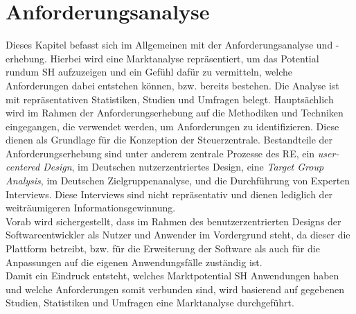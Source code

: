 \chapter{Anforderungsanalyse}
\label{chap:anforderungsanalyse}
    Dieses Kapitel befasst sich im Allgemeinen mit der Anforderungsanalyse und -erhebung. Hierbei wird eine
    Marktanalyse repräsentiert, um das Potential rundum \acl{SH} aufzuzeigen und ein Gefühl 
    dafür zu vermitteln, welche Anforderungen dabei entstehen können, bzw. bereits bestehen. Die Analyse ist 
    mit repräsentativen Statistiken, Studien und Umfragen belegt. Hauptsächlich wird im Rahmen der Anforderungserhebung 
    auf die Methodiken und Techniken eingegangen, die verwendet werden, um 
    Anforderungen zu identifizieren. Diese dienen als Grundlage für die Konzeption der Steuerzentrale. Bestandteile der 
    Anforderungserhebung sind unter anderem zentrale Prozesse des \acl{RE}, ein \textit{user-centered Design}, im Deutschen 
    nutzerzentriertes Design, eine \textit{Target Group Analysis}, im Deutschen Zielgruppenanalyse, und die Durchführung von 
    Experten Interviews. Diese Interviews sind nicht repräsentativ und dienen lediglich der weiträumigeren Informationsgewinnung. 
    \\
    Vorab wird sichergestellt, dass im Rahmen des benutzerzentrierten Designs der Softwareentwickler als Nutzer und Anwender im 
    Vordergrund steht, da dieser die Plattform betreibt, bzw. für die Erweiterung der Software als auch für die 
    Anpassungen auf die eigenen Anwendungsfälle zuständig ist.
    \\
    \linebreak
    Damit ein Eindruck entsteht, welches Marktpotential \acl{SH} Anwendungen haben und welche Anforderungen somit 
    verbunden sind, wird basierend auf gegebenen Studien, Statistiken und Umfragen eine Marktanalyse durchgeführt.
